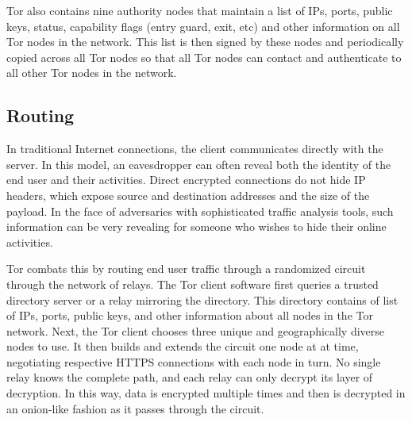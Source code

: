 Tor also contains nine authority nodes that maintain a list of IPs, ports, public keys, status, capability flags (entry guard, exit, etc) and other information on all Tor nodes in the network. This list is then signed by these nodes and periodically copied across all Tor nodes so that all Tor nodes can contact and authenticate to all other Tor nodes in the network.

\subsection{Routing}

In traditional Internet connections, the client communicates directly with the server. In this model, an eavesdropper can often reveal both the identity of the end user and their activities. Direct encrypted connections do not hide IP headers, which expose source and destination addresses and the size of the payload. In the face of adversaries with sophisticated traffic analysis tools, such information can be very revealing for someone who wishes to hide their online activities.

Tor combats this by routing end user traffic through a randomized circuit through the network of relays. The Tor client software first queries a trusted directory server or a relay mirroring the directory. This directory contains of list of IPs, ports, public keys, and other information about all nodes in the Tor network.\cite{Xin2009} Next, the Tor client chooses three unique and geographically diverse nodes to use. It then builds and extends the circuit one node at at time, negotiating respective HTTPS connections with each node in turn. No single relay knows the complete path, and each relay can only decrypt its layer of decryption. In this way, data is encrypted multiple times and then is decrypted in an onion-like fashion as it passes through the circuit.

